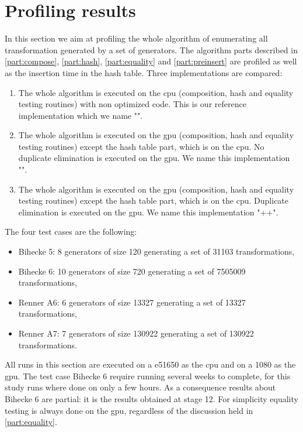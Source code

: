 {\section{Profiling results}
\label{part:results}
In this section we aim at profiling the whole algorithm of enumerating all transformation generated by a set of generators. 
The algorithm parts described in \autoref{part:compose}, \autoref{part:hash}, \autoref{part:equality} and \autoref{part:preinsert} are profiled as well as the insertion time in the hash table.
Three implementations are compared:
\begin{enumerate}
\item The whole algorithm is executed on the \gls{cpu} (composition, hash and equality testing routines) with non optimized code. This is our reference implementation which we name "". 
\item The whole algorithm is executed on the \gls{gpu} (composition, hash and equality testing routines) except the hash table part, which is on the \gls{cpu}. No duplicate elimination is executed on the \gls{gpu}.
We name this implementation "".
\item The whole algorithm is executed on the \gls{gpu} (composition, hash and equality testing routines) except the hash table part, which is on the \gls{cpu}. Duplicate elimination is executed on the \gls{gpu}.
We name this implementation "++".
\end{enumerate}
The four test cases are the following:
\begin{itemize}
\item Bihecke 5: 8 generators of size 120 generating a set of 31103 transformations,
\item Bihecke 6: 10 generators of size 720 generating a set of 7505009 transformations,
\item Renner A6: 6 generators of size 13327 generating a set of 13327 transformations,
\item Renner A7: 7 generators of size 130922 generating a set of 130922 transformations.
\end{itemize}


All runs in this section are executed on a \gls{e51650} as the \gls{cpu} and on a \gls{1080} as the \gls{gpu}.
The test case Bihecke 6 require running several weeks to complete, for this study runs where done on only a few hours.
As a consequence results about Bihecke 6 are partial: it is the results obtained at stage 12.
For simplicity equality testing is always done on the \gls{gpu}, regardless of the discussion held in \autoref{part:equality}.


}
